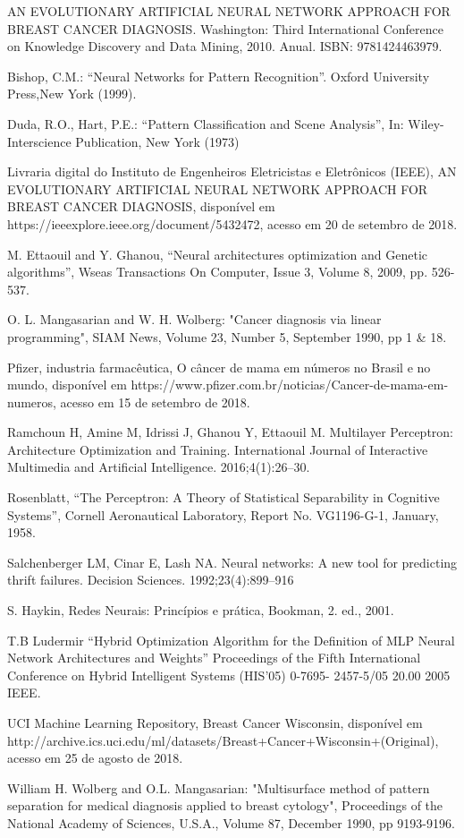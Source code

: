 \documentclass[conference]{IEEEtran}
\begin{document}
\begin{thebibliography}{00}

 AN EVOLUTIONARY ARTIFICIAL NEURAL NETWORK APPROACH FOR BREAST CANCER DIAGNOSIS. Washington: Third International Conference on Knowledge Discovery and Data Mining, 2010. Anual. ISBN: 9781424463979.

 Bishop, C.M.: “Neural Networks for Pattern Recognition”. Oxford University Press,New York (1999).

 Duda, R.O., Hart, P.E.: “Pattern Classification and Scene Analysis”, In: Wiley-Interscience Publication, New York (1973)

 Livraria digital do Instituto de Engenheiros Eletricistas e Eletrônicos (IEEE), AN EVOLUTIONARY ARTIFICIAL NEURAL NETWORK APPROACH FOR BREAST CANCER DIAGNOSIS, disponível em https://ieeexplore.ieee.org/document/5432472, acesso em 20 de setembro de 2018.

 M. Ettaouil and Y. Ghanou, “Neural architectures optimization and Genetic algorithms”, Wseas Transactions On Computer, Issue 3, Volume 8, 2009, pp. 526-537. 

 O. L. Mangasarian and W. H. Wolberg: "Cancer          diagnosis via linear 
      programming", SIAM News, Volume 23, Number 5, September 1990, pp 1 & 18.

 Pfizer, industria farmacêutica, O câncer de mama em números no Brasil e no mundo, disponível em https://www.pfizer.com.br/noticias/Cancer-de-mama-em-numeros, acesso em 15 de setembro de 2018.

 Ramchoun H, Amine M, Idrissi J, Ghanou Y, Ettaouil M. Multilayer Perceptron: Architecture Optimization and Training. International Journal of Interactive Multimedia and Artificial Intelligence. 2016;4(1):26–30.

 Rosenblatt, “The Perceptron: A Theory of Statistical Separability in Cognitive Systems”, Cornell Aeronautical Laboratory, Report No. VG1196-G-1, January, 1958. 

 Salchenberger LM, Cinar E, Lash NA. Neural networks: A new tool for predicting thrift failures. Decision Sciences. 1992;23(4):899–916

 S. Haykin, Redes Neurais: Princípios e prática, Bookman, 2. ed., 2001.

 T.B Ludermir “Hybrid Optimization Algorithm for the Definition of MLP Neural Network Architectures and Weights” Proceedings of the Fifth International Conference on Hybrid Intelligent Systems (HIS’05) 0-7695- 2457-5/05 20.00 2005 IEEE.

 UCI Machine Learning Repository, Breast Cancer Wisconsin, disponível em http://archive.ics.uci.edu/ml/datasets/Breast+Cancer+Wisconsin+(Original), acesso em 25 de agosto de 2018.

 William H. Wolberg and O.L. Mangasarian: "Multisurface method of pattern separation for medical diagnosis applied to breast cytology", Proceedings of the National Academy of Sciences, U.S.A., Volume 87, December 1990, pp 9193-9196.




\end{thebibliography}
\end{document}
